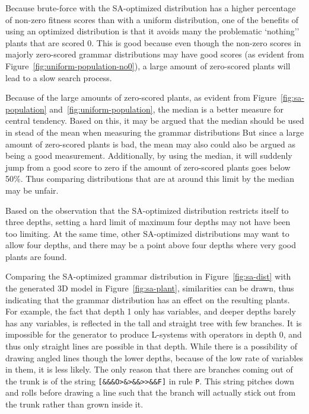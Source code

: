 Because brute-force with the SA-optimized distribution has a higher percentage of non-zero fitness scores than with a uniform distribution, one of the benefits of using an optimized distribution is that it avoids many the problematic `nothing'' plants that are scored 0.
This is good because even though the non-zero scores in majorly zero-scored grammar distributions may have good scores (as evident from Figure~\ref{fig:uniform-population-no0}), a large amount of zero-scored plants will lead to a slow search process.

Because of the large amounts of zero-scored plants, as evident from Figure~\ref{fig:sa-population} and~\ref{fig:uniform-population}, the median is a better measure for central tendency.
Based on this, it may be argued that the median should be used in stead of the mean when measuring the grammar distributions
But since a large amount of zero-scored plants is bad, the mean may also could also be argued as being a good measurement.
Additionally, by using the median, it will suddenly jump from a good score to zero if the amount of zero-scored plants goes below 50\%.
Thus comparing distributions that are at around this limit by the median may be unfair.

Based on the observation that the SA-optimized distribution restricts itself to three depths, setting a hard limit of maximum four depths may not have been too limiting.
At the same time, other SA-optimized distributions may want to allow four depths, and there may be a point above four depths where very good plants are found.

Comparing the SA-optimized grammar distribution in Figure~\ref{fig:sa-dist} with the generated 3D model in Figure~\ref{fig:sa-plant}, similarities can be drawn, thus indicating that the grammar distribution has an effect on the resulting plants.
For example, the fact that depth 1 only has variables, and deeper depths barely has any variables, is reflected in the tall and straight tree with few branches.
It is impossible for the generator to produce L-systems with operators in depth 0, and thus only straight lines are possible in that depth.
While there is a possibility of drawing angled lines though the lower depths, because of the low rate of variables in them, it is less likely.
The only reason that there are branches coming out of the trunk is of the string \texttt{[\&\&\&O>\&>\&\&>{}>\&\&F]} in rule \texttt{P}.
This string pitches down and rolls before drawing a line such that the branch will actually stick out from the trunk rather than grown inside it.

